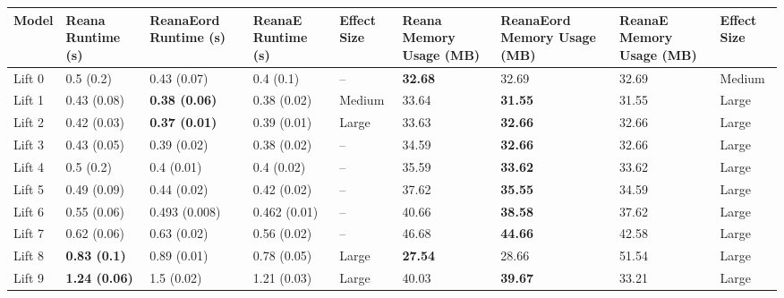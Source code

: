 \begin{tabular}{lllllllll}
\toprule
  Model &    Reana Runtime (s) & ReanaEord Runtime (s) & ReanaE Runtime (s) & Effect Size & Reana Memory Usage (MB) & ReanaEord Memory Usage (MB) & ReanaE Memory Usage (MB) & Effect Size \\
\midrule
 Lift 0 &            0.5 (0.2) &           0.43 (0.07) &          0.4 (0.1) &          -- &          \textbf{32.68} &                       32.69 &                    32.69 &      Medium \\
 Lift 1 &          0.43 (0.08) &  \textbf{0.38 (0.06)} &        0.38 (0.02) &      Medium &                   33.64 &              \textbf{31.55} &                    31.55 &       Large \\
 Lift 2 &          0.42 (0.03) &  \textbf{0.37 (0.01)} &        0.39 (0.01) &       Large &                   33.63 &              \textbf{32.66} &                    32.66 &       Large \\
 Lift 3 &          0.43 (0.05) &           0.39 (0.02) &        0.38 (0.02) &          -- &                   34.59 &              \textbf{32.66} &                    32.66 &       Large \\
 Lift 4 &            0.5 (0.2) &            0.4 (0.01) &         0.4 (0.02) &          -- &                   35.59 &              \textbf{33.62} &                    33.62 &       Large \\
 Lift 5 &          0.49 (0.09) &           0.44 (0.02) &        0.42 (0.02) &          -- &                   37.62 &              \textbf{35.55} &                    34.59 &       Large \\
 Lift 6 &          0.55 (0.06) &         0.493 (0.008) &       0.462 (0.01) &          -- &                   40.66 &              \textbf{38.58} &                    37.62 &       Large \\
 Lift 7 &          0.62 (0.06) &           0.63 (0.02) &        0.56 (0.02) &          -- &                   46.68 &              \textbf{44.66} &                    42.58 &       Large \\
 Lift 8 &  \textbf{0.83 (0.1)} &           0.89 (0.01) &        0.78 (0.05) &       Large &          \textbf{27.54} &                       28.66 &                    51.54 &       Large \\
 Lift 9 & \textbf{1.24 (0.06)} &            1.5 (0.02) &        1.21 (0.03) &       Large &                   40.03 &              \textbf{39.67} &                    33.21 &       Large \\

\end{tabular}
